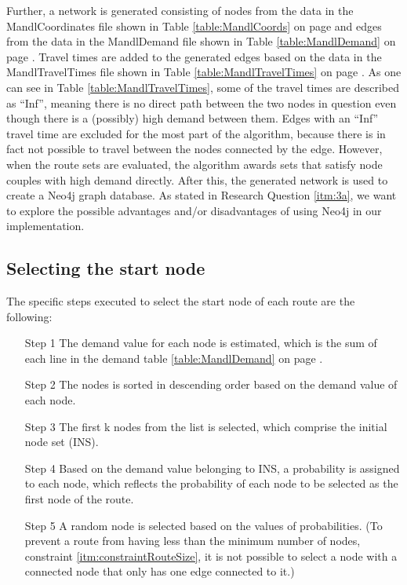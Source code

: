 Further, a network is generated consisting of nodes from the data in the MandlCoordinates file shown in Table \ref{table:MandlCoords} on page \pageref{table:MandlCoords} and edges from the data in the MandlDemand file shown in Table \ref{table:MandlDemand} on page \pageref{table:MandlDemand}. Travel times are added to the generated edges based on the data in the MandlTravelTimes file shown in Table \ref{table:MandlTravelTimes} on page \pageref{table:MandlTravelTimes}. As one can see in Table \ref{table:MandlTravelTimes}, some of the travel times are described as ``Inf'', meaning there is no direct path between the two nodes in question even though there is a (possibly) high demand between them. Edges with an ``Inf'' travel time are excluded for the most part of the algorithm, because there is in fact not possible to travel between the nodes connected by the edge. However, when the route sets are evaluated, the algorithm awards sets that satisfy node couples with high demand directly. After this, the generated network is used to create a Neo4j graph database. As stated in Research Question \ref{itm:3a}, we want to explore the possible advantages and/or disadvantages of using Neo4j in our implementation.



\subsection{Selecting the start node}
The specific steps executed to select the start node of each route are the following:
\begin{itemize}
\item[Step 1] The demand value for each node is estimated, which is the sum of each line in the demand table \ref{table:MandlDemand} on page \pageref{table:MandlDemand}. 
\item[Step 2] The nodes is sorted in descending order based on the demand value of each node.
\item[Step 3] The first k nodes from the list is selected, which comprise the initial node set (INS). 
\item[Step 4] Based on the demand value belonging to INS, a probability is assigned to each node, which reflects the probability of each node to be selected as the first node of the route. 
\item[Step 5] A random node is selected based on the values of probabilities. (To prevent a route from having less than the minimum number of nodes, constraint \ref{itm:constraintRouteSize}, it is not possible to select a node with a connected node that only has one edge connected to it.)
\end{itemize}

